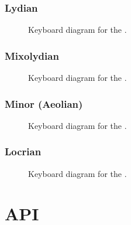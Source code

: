 \documentclass[letterpaper,10pt,english]{sphinxmanual}
\begin{document}
\subsection{Lydian}
\label{\detokenize{index:lydian}}
\begin{figure}[htbp]
\centering
\capstart

\noindent{}
\caption{Keyboard diagram for the .}\label{\detokenize{index:id17}}\end{figure}


\subsection{Mixolydian}
\label{\detokenize{index:mixolydian}}
\begin{figure}[htbp]
\centering
\capstart

\noindent{}
\caption{Keyboard diagram for the .}\label{\detokenize{index:id18}}\end{figure}


\subsection{Minor (Aeolian)}
\label{\detokenize{index:minor-aeolian}}
\begin{figure}[htbp]
\centering
\capstart

\noindent{}
\caption{Keyboard diagram for the .}\label{\detokenize{index:id19}}\end{figure}


\subsection{Locrian}
\label{\detokenize{index:locrian}}
\begin{figure}[htbp]
\centering
\capstart

\noindent{}
\caption{Keyboard diagram for the .}\label{\detokenize{index:id20}}\end{figure}


\chapter{API}
\label{\detokenize{index:api}}
\end{document}
